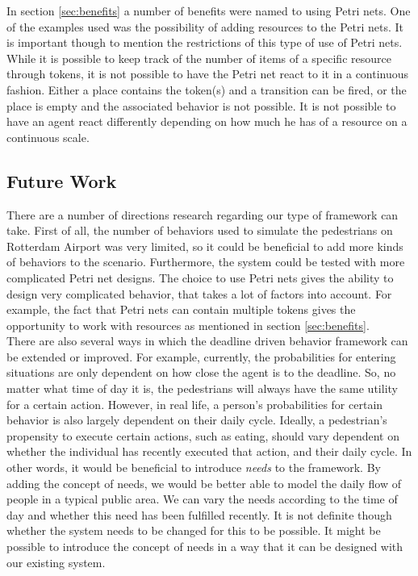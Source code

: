 \documentclass[11pt, a4paper]{book}
\begin{document}
In section \ref{sec:benefits} a number of benefits were named to using Petri nets. One of the examples used was the possibility of adding resources to the Petri nets. It is important though to mention the restrictions of this type of use of Petri nets. While it is possible to keep track of the number of items of a specific resource through tokens, it is not possible to have the Petri net react to it in a continuous fashion. Either a place contains the token(s) and a transition can be fired, or the place is empty and the associated behavior is not possible. It is not possible to have an agent react differently depending on how much he has of a resource on a continuous scale. 

\subsection{Future Work}
There are a number of directions research regarding our type of framework can take. First of all, the number of behaviors used to simulate the pedestrians on Rotterdam Airport was very limited, so it could be beneficial to add more kinds of behaviors to the scenario. Furthermore, the system could be tested with more complicated Petri net designs. The choice to use Petri nets gives the ability to design very complicated behavior, that takes a lot of factors into account. For example, the fact that Petri nets can contain multiple tokens gives the opportunity to work with resources as mentioned in section \ref{sec:benefits}.\\
There are also several ways in which the deadline driven behavior framework can be extended or improved. For example, currently, the probabilities for entering situations are only dependent on how close the agent is to the deadline. So, no matter what time of day it is, the pedestrians will always have the same utility for a certain action. However, in real life, a person's probabilities for certain behavior is also largely dependent on their daily cycle. Ideally, a pedestrian's propensity to execute certain actions, such as eating, should vary dependent on whether the individual has recently executed that action, and their daily cycle. In other words, it would be beneficial to introduce \emph{needs} to the framework. By adding the concept of needs, we would be better able to model the daily flow of people in a typical public area. We can vary the needs according to the time of day and whether this need has been fulfilled recently. It is not definite though whether the system needs to be changed for this to be possible. It might be possible to introduce the concept of needs in a way that it can be designed with our existing system.\\
\end{document}

